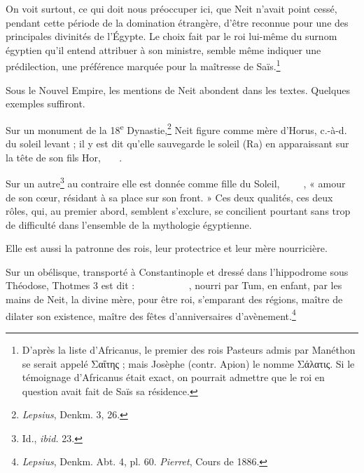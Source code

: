 \documentclass[letterpaper,twocolumn,openany,nodeprecatedcode]{dndbook}
\newcommand*\hieroAAAI{}
\newcommand*\hieroAAAX{}
\newcommand*\hieroAAAY{}
\newcommand*\hieroAABC{\raisebox{0.5ex}{}}
\newcommand*\hieroAABR{}
\newcommand*\hieroAACB{\raisebox{0.5ex}{}}
\newcommand*\hieroAACM{}
\newcommand*\hieroAACS{}
\newcommand*\hieroAAEC{}
\newcommand*\hieroAAEK{}
\newcommand*\hieroAAEP{\raisebox{0.5ex}{}}
\newcommand*\hieroAAEZ{}
\newcommand*\hieroAAFA{}
\newcommand*\hieroAAHY{}
\newcommand*\hieroAAIF{}
\newcommand*\hieroAAKO{}
\newcommand*\hieroAALR{\raisebox{0.3ex}{}}
\newcommand*\hieroAAND{\raisebox{0.5ex}{}}
\newcommand*\hieroAANP{}
\newcommand*\hieroAAON{}
\newcommand*\hieroAATW{}
\newcommand*\hieroAAVF{}
\newcommand*\hieroAAVR{}
\newcommand*\hieroAAVS{}
\newcommand*\hieroAAVT{\raisebox{0.3ex}{}}
\newcommand*\hieroAAVU{}
\newcommand*\hieroAAVV{}
\newcommand*\hieroAAVW{}
\newcommand*\hieroAAVY{}
\newcommand*\hieroAAVZ{}
\newcommand*\hieroAAWA{}
\newcommand*\hieroAAWB{\raisebox{0.3ex}{}}
\newcommand*\hieroAAWC{}
\newcommand*\hieroAAWD{}
\newcommand*\hieroAAWE{}
\newcommand*\hieroAAWF{}
\newcommand*\hieroAAWG{}
\newcommand*\hieroAAWH{}
\begin{document}
On voit surtout, ce qui doit nous préoccuper ici, que Neit n'avait point cessé, pendant cette période de la domination étrangère, d'être reconnue pour une des principales divinités de l'Égypte. Le choix fait par le roi lui-même du surnom égyptien qu'il entend attribuer à son ministre, semble même indiquer une prédilection, une préférence marquée pour la maîtresse de Saïs.\footnote{D'après la liste d'Africanus, le premier des rois Pasteurs admis par Manéthon se serait appelé Σαΐτης ; mais Josèphe (contr. Apion) le nomme Σάλατις. Si le témoignage d'Africanus était exact, on pourrait admettre que le roi en question avait fait de Saïs sa résidence.}

Sous le Nouvel Empire, les mentions de Neit abondent dans les textes. Quelques exemples suffiront.

Sur un monument de la 18\textsuperscript{e} Dynastie,\footnote{\emph{Lepsius}, Denkm. 3, 26.} Neit figure comme mère d'Horus, c.-à-d. du soleil levant ; il y est dit qu'elle sauvegarde le soleil (Ra) en apparaissant sur la tête de son fils Hor, $\hieroAACS\:\hieroAAVR\:\hieroAAIF\allowbreak\:\hieroAATW\:\hieroAAEC\:\hieroAAVF\allowbreak\:\hieroAAVS\:\hieroAAON$.

Sur un autre\footnote{Id., \emph{ibid.} 23.} au contraire elle est donnée comme fille du Soleil, $\hieroAAAI\:\hieroAACB\:\hieroAAND\allowbreak\:\hieroAAVT\:\hieroAAVU\:\hieroAAVV\allowbreak\:\hieroAAHY\:\hieroAACS\allowbreak\:\hieroAANP\:\hieroAAVW$, « amour de son cœur, résidant à sa place sur son front. » Ces deux qualités, ces deux rôles, qui, au premier abord, semblent s'exclure, se concilient pourtant sans trop de difficulté dans l'ensemble de la mythologie égyptienne.

Elle est aussi la patronne des rois, leur protectrice et leur mère nourricière.

Sur un obélisque, transporté à Constantinople et dressé dans l'hippodrome sous Théodose, Thotmes 3 est dit : $\hieroAAVY\:\hieroAAVZ\:\hieroAABR\allowbreak\:\hieroAAAY\:\hieroAAEZ\:\hieroAAFA\:\hieroAAEC\:\hieroAAWA\:\hieroAALR\allowbreak\:\hieroAAEK\:\hieroAAKO\:\hieroAACB\:\hieroAAEP\:\hieroAAAX\:\hieroAACB\allowbreak\:\hieroAAWB\:\hieroAAWC\:\hieroAABC\:\hieroAAWD\:\hieroAAWE\:\hieroAACM\allowbreak\:\hieroAAWF\:\hieroAAWG\:\hieroAAWH$, nourri par
Tum, en enfant, par les mains de Neit, la divine mère, pour être roi, s'emparant des régions, maître de dilater son existence, maître des fêtes d'anniversaires d'avènement.\footnote{\emph{Lepsius}, Denkm. Abt. 4, pl. 60. \emph{Pierret}, Cours de 1886.}
\end{document}
